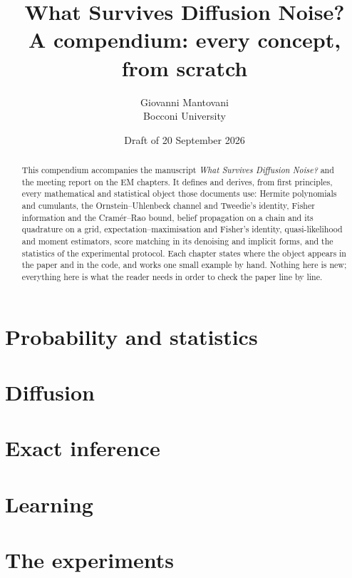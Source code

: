 \documentclass[11pt,a4paper]{report}
\title{\textbf{What Survives Diffusion Noise?}\\[0.4em]
  \Large A compendium: every concept, from scratch}
\author{Giovanni Mantovani\\ \small Bocconi University}
\date{Draft of 20 September 2026}
\theoremstyle{plain}
\theoremstyle{definition}
\theoremstyle{remark}
\begin{document}
\maketitle

\begin{abstract}
\noindent This compendium accompanies the manuscript \emph{What Survives Diffusion Noise?}
and the meeting report on the EM chapters. It defines and derives, from first principles,
every mathematical and statistical object those documents use: Hermite polynomials and
cumulants, the Ornstein--Uhlenbeck channel and Tweedie's identity, Fisher information and
the Cram\'er--Rao bound, belief propagation on a chain and its quadrature on a grid,
expectation--maximisation and Fisher's identity, quasi-likelihood and moment estimators,
score matching in its denoising and implicit forms, and the statistics of the experimental
protocol. Each chapter states where the object appears in the paper and in the code, and
works one small example by hand. Nothing here is new; everything here is what the reader
needs in order to check the paper line by line.
\end{abstract}

\tableofcontents



\part{Probability and statistics}






\part{Diffusion}





\part{Exact inference}




\part{Learning}






\part{The experiments}




\appendix


\printindex
\end{document}
